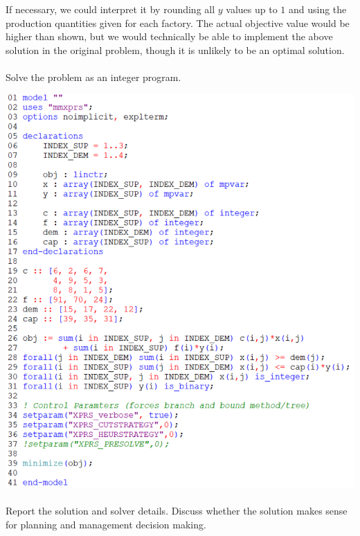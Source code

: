 \documentclass[12pt]{article}
\newenvironment{fullbox}{\begin{lrbox}{\savefullbox}\begin{minipage}{\dimexpr\textwidth-2\fboxsep\relax}}{\end{minipage}\end{lrbox}\begin{center}\framebox[\textwidth]{\usebox{\savefullbox}}\end{center}}
\newenvironment{pbox}[1][]{\begin{fullbox}\ifx#1\empty\else\paragraph{#1}\fi}{\end{fullbox}}
\theoremstyle{definition}
\begin{document}
If necessary, we could interpret it by rounding all $y$ values up to $1$ and using the production quantities given for each factory. The actual objective value would be higher than shown, but we would technically be able to implement the above solution in the original problem, though it is unlikely to be an optimal solution. 



\newpage
\begin{pbox}
    Solve the problem as an integer program.
\end{pbox}

\begin{center}
    \includegraphics[width=\textwidth]{code2.png}
\end{center}

\newpage
\newpage
\begin{pbox}
    Report the solution and solver details. Discuss whether the solution makes sense for planning and management decision making.
\end{pbox}
\end{document}
